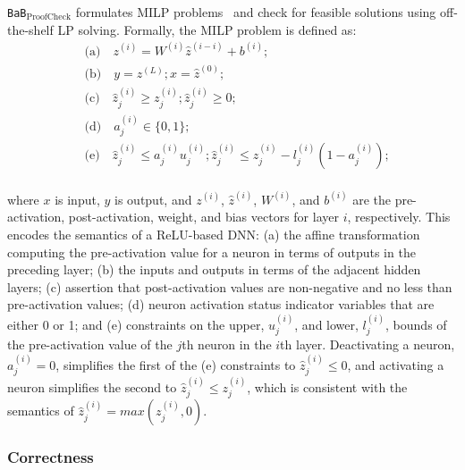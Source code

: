 \documentclass[oneside,11pt,dvipsnames]{book}
\numberwithin{equation}{section}
\theoremstyle{definition}
\theoremstyle{remark}
\newcommand{\proofcheck}{\texttt{BaB$_{\text{ProofCheck}}$}}
\begin{document}
\proofcheck{} formulates MILP problems~\cite{tjeng2019evaluating} and check for feasible solutions using off-the-shelf LP solving. Formally, the MILP problem is defined as:
\begin{equation}
    \begin{aligned}
        &\mbox{(a)}\quad z^{(i)} = W^{(i)} \hat{z}^{(i-i)} + b^{(i)};\\
        &\mbox{(b)}\quad y = z^{(L)};  x = \hat{z}^{(0)}; \\
        &\mbox{(c)}\quad \hat{z}_j^{(i)} \ge {z}_j^{(i)}; \hat{z}_j^{(i)} \ge 0; \\
        &\mbox{(d)}\quad a_j^{(i)} \in \{ 0, 1\} ;\\
        &\mbox{(e)}\quad \hat{z}_j^{(i)} \le {a}_j^{(i)} {u}_j^{(i)}; \hat{z}_j^{(i)} \le {z}_j^{(i)} - {l}_j^{(i)}(1 - {a}_j^{(i)}); \\
    \end{aligned}
    \label{eq:mip}
\end{equation}

\noindent where $x$ is input, $y$ is output, and $z^{(i)}$, $\hat{z}^{(i)}$, $W^{(i)}$, and $b^{(i)}$ are the pre-activation, post-activation, weight, and bias vectors for layer $i$, respectively. 
This encodes the semantics of a ReLU-based DNN:  
(a) the affine transformation computing the pre-activation value for a neuron in terms of outputs in the preceding layer;
(b) the inputs and outputs in terms of the adjacent hidden layers;
(c) assertion that post-activation values are non-negative and no less than pre-activation values;
(d) neuron activation status indicator variables that are either 0 or 1; and
(e) constraints on the upper, $u_j^{(i)}$, and lower, $l_j^{(i)}$, bounds of the pre-activation value of the $j$th neuron in the $i$th layer.
Deactivating a neuron, $a_j^{(i)} = 0$, simplifies the first of the (e) constraints to $\hat{z}_j^{(i)} \le 0$, and activating a neuron simplifies the second to $\hat{z}_j^{(i)} \le z_j^{(i)}$, which is consistent with the semantics of $\hat{z}_j^{(i)} = max(z_j^{(i)},0)$.


\subsubsection{Correctness}\label{sec:checker-core-correctness}
\end{document}
